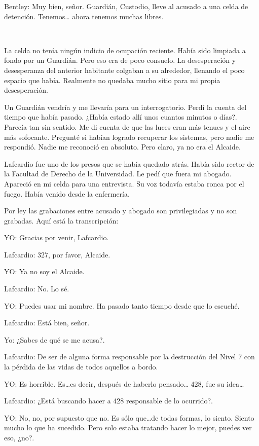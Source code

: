 Bentley: Muy bien, señor. Guardián, Custodio, lleve al acusado a una
celda de detención. Tenemos\ldots{} ahora tenemos muchas libres.

~

La celda no tenía ningún indicio de ocupación reciente. Había sido
limpiada a fondo por un Guardián. Pero eso era de poco consuelo. La
desesperación y desesperanza del anterior habitante colgaban a su
alrededor, llenando el poco espacio que había. Realmente no quedaba
mucho sitio para mi propia desesperación.

Un Guardián vendría y me llevaría para un interrogatorio. Perdí la
cuenta del tiempo que había pasado. ¿Había estado allí unos cuantos
minutos o días?. Parecía tan sin sentido. Me di cuenta de que las luces
eran más tenues y el aire más sofocante. Pregunté si habían logrado
recuperar los sistemas, pero nadie me respondió. Nadie me reconoció en
absoluto. Pero claro, ya no era el Alcaide.

Lafcardio fue uno de los presos que se había quedado atrás. Había sido
rector de la Facultad de Derecho de la Universidad. Le pedí que fuera mi
abogado. Apareció en mi celda para una entrevista. Su voz todavía estaba
ronca por el fuego. Había venido desde la enfermería.

Por ley las grabaciones entre acusado y abogado son privilegiadas y no
son grabadas. Aquí está la transcripción:

YO: Gracias por venir, Lafcardio.

Lafcardio: 327, por favor, Alcaide.

YO: Ya no soy el Alcaide.

Lafcardio: No. Lo sé.

YO: Puedes usar mi nombre. Ha pasado tanto tiempo desde que lo escuché.

Lafcardio: Está bien, señor.

Yo: ¿Sabes de qué se me acusa?.

Lafcardio: De ser de alguna forma responsable por la destrucción del
Nivel 7 con la pérdida de las vidas de todos aquellos a bordo.

YO: Es horrible. Es\ldots{}es decir, después de haberlo pensado\ldots{}
428, fue su idea\ldots{}

Lafcardio: ¿Está buscando hacer a 428 responsable de lo ocurrido?.

YO: No, no, por supuesto que no. Es sólo que\ldots{}de todas formas, lo
siento. Siento mucho lo que ha sucedido. Pero solo estaba tratando hacer
lo mejor, puedes ver eso, ¿no?.


